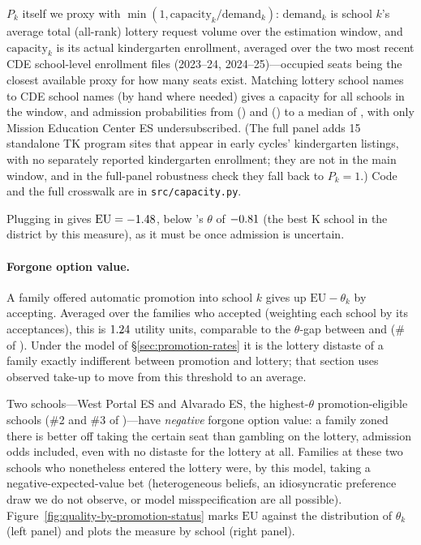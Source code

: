\documentclass{article}
\begin{document}
$P_k$ itself we proxy with $\min(1, \text{capacity}_k / \text{demand}_k)$: $\text{demand}_k$ is school $k$'s average total (all-rank) lottery request volume over the estimation window, and $\text{capacity}_k$ is its actual kindergarten enrollment, averaged over the two most recent CDE school-level enrollment files (2023--24, 2024--25)---occupied seats being the closest available proxy for how many seats exist. Matching lottery school names to CDE school names (by hand where needed) gives a capacity for all \numSchools{} schools in the window, and admission probabilities from \numAdmitMin{} (\numAdmitMinSchool) and \numAdmitTop{} (\numTopSchool) to a median of \numAdmitMedian, with only Mission Education Center ES undersubscribed. (The full panel adds 15 standalone TK program sites that appear in early cycles' kindergarten listings, with no separately reported kindergarten enrollment; they are not in the main window, and in the full-panel robustness check they fall back to $P_k = 1$.) Code and the full crosswalk are in \texttt{src/capacity.py}.

Plugging in gives $\mathrm{EU} = -1.48$, below \numTopSchool's $\theta$ of $-0.81$ (the best K school in the district by this measure), as it must be once admission is uncertain.

\paragraph{Forgone option value.} A family offered automatic promotion into school $k$ gives up $\mathrm{EU} - \theta_k$ by accepting. Averaged over the \numPromoted{} families who accepted (weighting each school by its acceptances), this is $1.24$ utility units, comparable to the $\theta$-gap between \numTopSchool{} and \numFOVbaseSchool{} (\#\numFOVbaseRank{} of \numSchools). Under the model of \S\ref{sec:promotion-rates} it is the lottery distaste of a family exactly indifferent between promotion and lottery; that section uses observed take-up to move from this threshold to an average.

Two schools---West Portal ES and Alvarado ES, the highest-$\theta$ promotion-eligible schools (\#2 and \#3 of \numSchools)---have \emph{negative} forgone option value: a family zoned there is better off taking the certain seat than gambling on the lottery, admission odds included, even with no distaste for the lottery at all. Families at these two schools who nonetheless entered the lottery were, by this model, taking a negative-expected-value bet (heterogeneous beliefs, an idiosyncratic preference draw we do not observe, or model misspecification are all possible). Figure~\ref{fig:quality-by-promotion-status} marks $\mathrm{EU}$ against the distribution of $\theta_k$ (left panel) and plots the measure by school (right panel).
\end{document}

